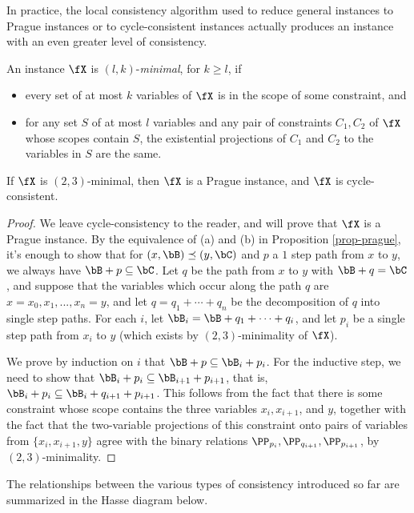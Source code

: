 In practice, the local consistency algorithm used to reduce general instances to Prague instances or to cycle-consistent instances actually produces an instance with an even greater level of consistency.

\begin{defn} An instance $\fX$ is $(l,k)$-\emph{minimal}, for $k \ge l$, if
\begin{itemize}
\item every set of at most $k$ variables of $\fX$ is in the scope of some constraint, and
\item for any set $S$ of at most $l$ variables and any pair of constraints $C_1, C_2$ of $\fX$ whose scopes contain $S$, the existential projections of $C_1$ and $C_2$ to the variables in $S$ are the same.
\end{itemize}
\end{defn}

\begin{prop} If $\fX$ is $(2,3)$-minimal, then $\fX$ is a Prague instance, and $\fX$ is cycle-consistent.
\end{prop}
\begin{proof} We leave cycle-consistency to the reader, and will prove that $\fX$ is a Prague instance. By the equivalence of (a) and (b) in Proposition \ref{prop-prague}, it's enough to show that for $(x,\bB) \preceq (y,\bC)$ and $p$ a $1$ step path from $x$ to $y$, we always have $\bB + p \subseteq \bC$. Let $q$ be the path from $x$ to $y$ with $\bB + q = \bC$, and suppose that the variables which occur along the path $q$ are $x = x_0, x_1, ..., x_n = y$, and let $q = q_1 + \cdots + q_n$ be the decomposition of $q$ into single step paths. For each $i$, let $\bB_i = \bB + q_1 + \cdots + q_i$, and let $p_i$ be a single step path from $x_i$ to $y$ (which exists by $(2,3)$-minimality of $\fX$).

We prove by induction on $i$ that $\bB + p \subseteq \bB_i + p_i$. For the inductive step, we need to show that $\bB_i + p_i \subseteq \bB_{i+1} + p_{i+1}$, that is, $\bB_i + p_i \subseteq \bB_i + q_{i+1} + p_{i+1}$. This follows from the fact that there is some constraint whose scope contains the three variables $x_i, x_{i+1}$, and $y$, together with the fact that the two-variable projections of this constraint onto pairs of variables from $\{x_i,x_{i+1},y\}$ agree with the binary relations $\PP_{p_i}, \PP_{q_{i+1}}, \PP_{p_{i+1}}$, by $(2,3)$-minimality.
\end{proof}

The relationships between the various types of consistency introduced so far are summarized in the Hasse diagram below.


